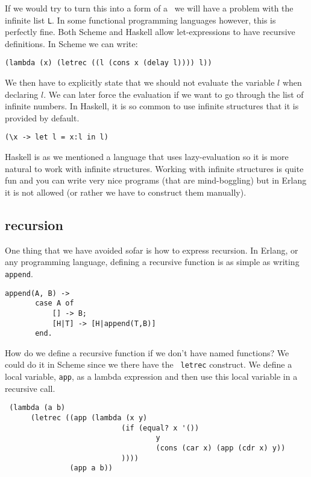 \documentclass[a4paper,11pt]{article}
\begin{document}
If we would try to turn this into a form of a \lame\ we will have a
problem with the infinite list {\tt L}. In some functional
programming languages however, this is perfectly fine. Both Scheme and
Haskell allow let-expressions to have recursive definitions. In Scheme
we can write:

\begin{center}{\tt  (lambda (x) (letrec ((l (cons x (delay l)))) l))}
\end{center}

We then have to explicitly state that we should not evaluate the
variable $l$ when declaring $l$. We can later force the evaluation if
we want to go through the list of infinite numbers. In Haskell, it is
so common to use infinite structures that it is provided by default. 

\begin{center}{\tt  (\textbackslash x  -> let  l = x:l  in  l)}
\end{center}

Haskell is as we mentioned a language that uses lazy-evaluation so it
is more natural to work with infinite structures. Working with
infinite structures is quite fun and you can write very nice programs
(that are mind-boggling) but in Erlang it is not allowed (or rather we
have to construct them manually).

\subsection{recursion}

One thing that we have avoided sofar is how to express recursion. In
Erlang, or any programming language, defining a recursive function is
as simple as writing {\tt append}.

\begin{verbatim}
append(A, B) -> 
       case A of
           [] -> B;
           [H|T] -> [H|append(T,B)]
       end.         
\end{verbatim}

How do we define a recursive function if we don't have named
functions? We could do it in Scheme since we there have the {\tt
  letrec} construct. We define a local variable, {\tt app}, as a
lambda expression and then use this local variable in a recursive
call.

\vspace{10pt}

\begin{verbatim}
 (lambda (a b) 
      (letrec ((app (lambda (x y) 
                           (if (equal? x '()) 
                                   y 
                                   (cons (car x) (app (cdr x) y))
                           )))) 
               (app a b))
\end{verbatim}
\vspace{10pt}
\end{document}
